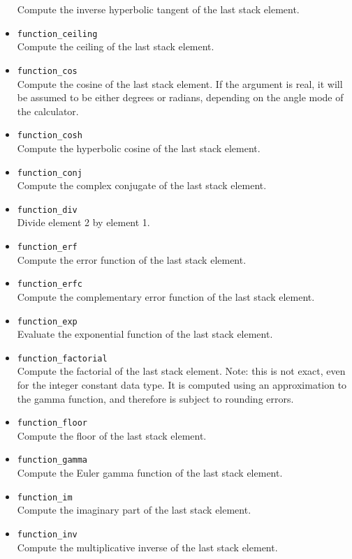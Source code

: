 \documentclass[11pt,notitlepage]{article}
\begin{document}
\begin{itemize}
      Compute the inverse hyperbolic tangent of the last stack element.
   \item {\tt function\_ceiling} \\
      Compute the ceiling of the last stack element.
   \item {\tt function\_cos} \\
      Compute the cosine of the last stack element.  If the argument is real,
      it will be assumed to be either degrees or radians, depending on the
      angle mode of the calculator.
   \item {\tt function\_cosh} \\
      Compute the hyperbolic cosine of the last stack element.
   \item {\tt function\_conj} \\
      Compute the complex conjugate of the last stack element.
   \item {\tt function\_div} \\
      Divide element 2 by element 1.
   \item {\tt function\_erf} \\
      Compute the error function of the last stack element.
   \item {\tt function\_erfc} \\
      Compute the complementary error function of the last stack element.
   \item {\tt function\_exp} \\
      Evaluate the exponential function of the last stack element.
   \item {\tt function\_factorial} \\
      Compute the factorial of the last stack element.  Note: this is not
      exact, even for the integer constant data type.  It is computed using
      an approximation to the gamma function, and therefore is subject to rounding 
      errors.
   \item {\tt function\_floor} \\
      Compute the floor of the last stack element.
   \item {\tt function\_gamma} \\
      Compute the Euler gamma function of the last stack element.
   \item {\tt function\_im} \\
      Compute the imaginary part of the last stack element.
   \item {\tt function\_inv} \\
      Compute the multiplicative inverse of the last stack element.

\end{itemize}
\end{document}
